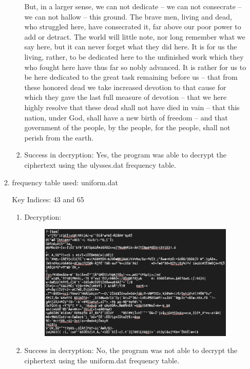 \documentclass{ashoka-crypto}
\begin{document}
\begin{enumerate}
\begin{enumerate}
\begin{enumerate}
But, in a larger sense, we can not dedicate -- we can not consecrate -- we can not hallow -- this ground. The brave men, living and dead, who struggled here, have consecrated it, far above our poor power to add or detract. The world will little note, nor long remember what we say here, but it can never forget what they did here. It is for us the living, rather, to be dedicated here to the unfinished work which they who fought here have thus far so nobly advanced. It is rather for us to be here dedicated to the great task remaining before us -- that from these honored dead we take increased devotion to that cause for which they gave the last full measure of devotion -- that we here highly resolve that these dead shall not have died in vain -- that this nation, under God, shall have a new birth of freedom -- and that government of the people, by the people, for the people, shall not perish from the earth.

\item Success in decryption: Yes, the program was able to decrypt the ciphertext using the ulysses.dat frequency table.
\end{enumerate}
\item frequency table used: uniform.dat

Key Indices: 43 and 65
\begin{enumerate}
\item Decryption:
\begin{figure}[h]
\includegraphics[width=12cm]{3_1_uniform}
\centering
\end{figure}

\item Success in decryption: No, the program was not able to decrypt the ciphertext using the uniform.dat frequency table.
\end{enumerate}
\end{enumerate}


\end{enumerate}
\end{document}
